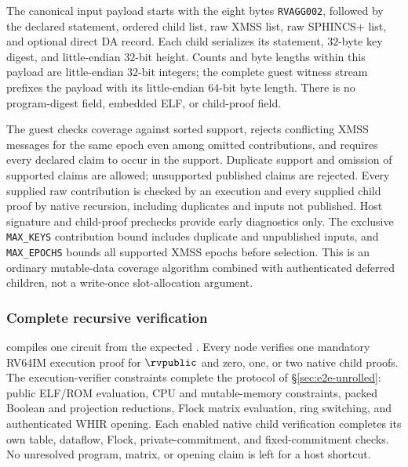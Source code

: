 The canonical input payload starts with the eight bytes \texttt{RVAGG002}, followed by the declared statement, ordered child list, raw XMSS list, raw SPHINCS+ list, and optional direct DA record. Each child serializes its statement, $32$-byte key digest, and little-endian $32$-bit height. Counts and byte lengths within this payload are little-endian $32$-bit integers; the complete guest witness stream prefixes the payload with its little-endian $64$-bit byte length. There is no program-digest field, embedded ELF, or child-proof field.

The guest checks coverage against sorted support, rejects conflicting XMSS messages for the same epoch even among omitted contributions, and requires every declared claim to occur in the support. Duplicate support and omission of supported claims are allowed; unsupported published claims are rejected. Every supplied raw contribution is checked by an execution and every supplied child proof by native recursion, including duplicates and inputs not published. Host signature and child-proof prechecks provide early diagnostics only. The exclusive \texttt{MAX\_KEYS} contribution bound includes duplicate and unpublished inputs, and \texttt{MAX\_EPOCHS} bounds all supported XMSS epochs before selection. This is an ordinary mutable-data coverage algorithm combined with authenticated deferred children, not a write-once slot-allocation argument.

\subsubsection{Complete recursive verification}\label{sec:deferred-claims}

 compiles one circuit from the expected . Every node verifies one mandatory RV64IM execution proof for $\rvpublic$ and zero, one, or two native child proofs. The execution-verifier constraints complete the protocol of \S\ref{sec:e2e-unrolled}: public ELF/ROM evaluation, CPU and mutable-memory constraints, packed Boolean and projection reductions, Flock matrix evaluation, ring switching, and authenticated WHIR opening. Each enabled native child verification completes its own table, dataflow, Flock, private-commitment, and fixed-commitment checks. No unresolved program, matrix, or opening claim is left for a host shortcut.

